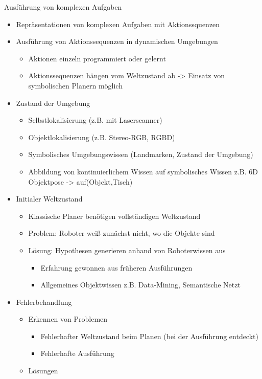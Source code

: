 \documentclass[paper=a4, fontsize=11pt]{scrartcl} %
\numberwithin{equation}{section} %
\numberwithin{figure}{section} %
\numberwithin{table}{section} %
\begin{document}
Ausführung von komplexen Aufgaben
\begin{itemize}
\item Repräsentationen von komplexen Aufgaben mit Aktionssquenzen
\item Ausführung von Aktionssequenzen in dynamischen Umgebungen
\begin{itemize}
\item Aktionen einzeln programmiert oder gelernt
\item Aktionssequenzen hängen vom Weltzustand ab -> Einsatz von symbolischen Planern möglich
\end{itemize}
\item Zustand der Umgebung
\begin{itemize}
\item Selbstlokalisierung (z.B. mit Laserscanner)
\item Objektlokalisierung (z.B. Stereo-RGB, RGBD)
\item Symbolisches Umgebungswissen (Landmarken, Zustand der Umgebung)
\item Abbildung von kontinuierlichem Wissen auf symbolisches Wissen z.B. 6D Objektpose -> auf(Objekt,Tisch)
\end{itemize}
\item Initialer Weltzustand
\begin{itemize}
\item Klassische Planer benötigen vollständigen Weltzustand
\item Problem: Roboter weiß zunächst nicht, wo die Objekte sind
\item Lösung: Hypothesen generieren anhand von Roboterwissen aus
\begin{itemize}
\item Erfahrung gewonnen aus früheren Ausführungen
\item Allgemeines Objektwissen z.B. Data-Mining, Semantische Netzt
\end{itemize}
\end{itemize}
\item Fehlerbehandlung
\begin{itemize}
\item Erkennen von Problemen
\begin{itemize}
\item Fehlerhafter Weltzustand beim Planen (bei der Ausführung entdeckt)
\item Fehlerhafte Ausführung
\end{itemize}
\item Lösungen
\begin{itemize}

\end{itemize}
\end{itemize}
\end{itemize}
\end{document}
